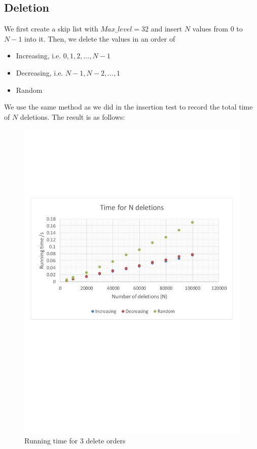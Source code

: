 \subsection{Deletion}
We first create a skip list with $Max\_level=32$ and insert $N$ values from $0$ to $N-1$ into it. Then, we delete the values in an order of
\begin{itemize}
    \item Increasing, i.e. $0,1,2,\ldots,N-1$
    \item Decreasing, i.e. $N-1,N-2,\ldots,1$
    \item Random
\end{itemize}
We use the same method as we did in the insertion test to record the total time of $N$ deletions. The result is as follows:
\begin{figure}[H]
    \centering
    \includegraphics[width=\textwidth]{testing_results/delete.pdf}
    \caption{Running time for 3 delete orders}
\end{figure}

